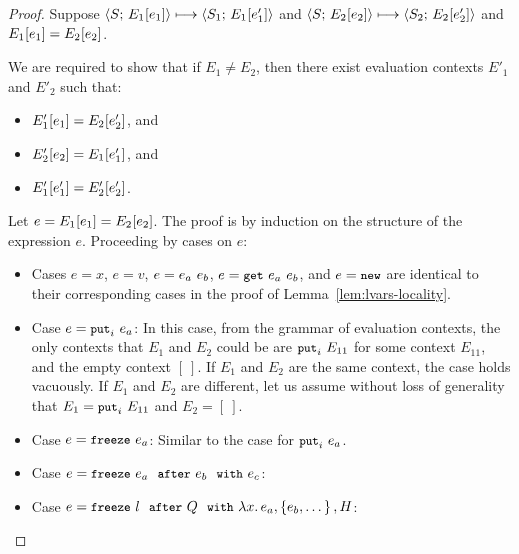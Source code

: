 \begin{proof}
  Suppose $\langle S;\, E_1\hspace{-0.5mm}\left[e_1\right] \rangle \longmapsto \langle S_1;\, E_1\hspace{-0.5mm}\left[e'_1\right] \rangle$ and
  $\langle S;\, E_2\hspace{-0.5mm}\left[e_2\right] \rangle \longmapsto
  \langle S_2;\, E_2\hspace{-0.5mm}\left[e'_2\right] \rangle$ and $E_1\hspace{-0.5mm}\left[e_1\right] =
  E_2\hspace{-0.5mm}\left[e_2\right]$.

  We are required to show that if $E_1 \neq E_2$, then there exist
  evaluation contexts $E'_1$ and $E'_2$ such that:
  \begin{itemize}
  \item $E'_1\hspace{-0.5mm}\left[e_1\right] = E_2\hspace{-0.5mm}\left[e'_2\right]$, and
  \item $E'_2\hspace{-0.5mm}\left[e_2\right] = E_1\hspace{-0.5mm}\left[e'_1\right]$, and
  \item $E'_1\hspace{-0.5mm}\left[e'_1\right] = E'_2\hspace{-0.5mm}\left[e'_2\right]$.
  \end{itemize}

  Let $e = E_1\hspace{-0.5mm}\left[e_1\right] = E_2\hspace{-0.5mm}\left[e_2\right]$.  The proof is
  by induction on the structure of the expression $e$.  Proceeding by
  cases on $e$:

  \begin{itemize}

    \item Cases $e = x$, $e = v$, $e = e_a~e_b$, $e = \mbox{\small{\texttt{get}}}~e_a~e_b$, and
      $e = \mbox{\small{\texttt{new}}}$ are identical to their corresponding cases in the proof
      of Lemma~\ref{lem:lvars-locality}.

    \item Case $e = \mbox{\small{\texttt{put}}}_i~e_a$: In this case, from the grammar of
      evaluation contexts, the only contexts that $E_1$ and $E_2$
      could be are $\mbox{\small{\texttt{put}}}_i~E_{11}$ for some context $E_{11}$, and
      the empty context $[~]$.  If $E_1$ and $E_2$ are the same
      context, the case holds vacuously.  If $E_1$ and $E_2$ are
      different, let us assume without loss of generality that $E_1 =
      \mbox{\small{\texttt{put}}}_i~E_{11}$ and $E_2 = [~]$. 

    \item Case $e = \mbox{\small{\texttt{freeze}}}~e_a$: Similar to the case for $\mbox{\small{\texttt{put}}}_i~e_a$.

    \item Case $e = \mbox{\small{\texttt{freeze}}}~e_a~~{\mbox{\small{\texttt{after}}}}~e_b~~{\mbox{\small{\texttt{with}}}}~e_c$: 

    \item Case $e = \mbox{\small{\texttt{freeze}}}~l~~{\mbox{\small{\texttt{after}}}}~Q~~{\mbox{\small{\texttt{with}}}}~\lambda x.\,e_a, \left\{e_b, \dots\right\}, H$: 

  \end{itemize}
\end{proof}
